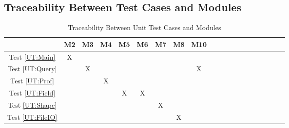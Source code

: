 \documentclass[12pt, titlepage]{article}
\begin{document}


					
					
					
					
					

					
					
					
					




\subsection{Traceability Between Test Cases and Modules}


\begin{table}[h!]
  \centering
  \begin{tabular}{|c|c|c|c|c|c|c|c|c|c|c|c|c|c|c|c|c|c|c|c|}
  \hline
                            & M2 & M3 & M4 & M5 & M6 & M7 & M8 & M10 \\
  \hline
  Test \ref{UT:Main}        & X  &    &    &    &    &    &    &     \\\hline
  Test \ref{UT:Query}       &    & X  &    &    &    &    &    & X   \\\hline
  Test \ref{UT:Prof}        &    &    & X  &    &    &    &    &     \\\hline
  Test \ref{UT:Field}       &    &    &    & X  & X  &    &    &     \\\hline
  Test \ref{UT:Shape}       &    &    &    &    &    & X  &    &     \\\hline
  Test \ref{UT:FileIO}      &    &    &    &    &    &    & X  &     \\\hline
  \end{tabular}
  \caption{Traceability Between Unit Test Cases and Modules}
  \label{Table:A_trace}
\end{table}
				
\end{document}
